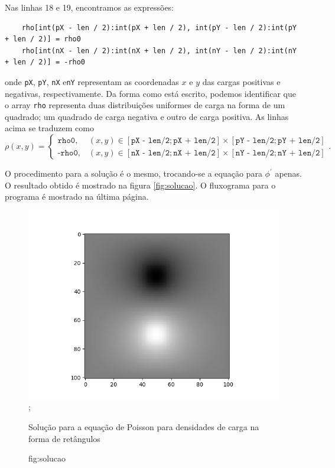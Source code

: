   Nas linhas 18 e 19, encontramos as expressões:
  \begin{lstlisting}
    rho[int(pX - len / 2):int(pX + len / 2), int(pY - len / 2):int(pY + len / 2)] = rho0
    rho[int(nX - len / 2):int(nX + len / 2), int(nY - len / 2):int(nY + len / 2)] = -rho0
  \end{lstlisting}

  onde \texttt{pX}, \texttt{pY}, \texttt{nX} e\texttt{nY} representam as coordenadas $x$ e $y$ das cargas positivas e negativas, respectivamente. Da forma como está escrito, podemos identificar que o array \texttt{rho} representa duas distribuições uniformes de carga na forma de um quadrado; um quadrado de carga negativa e outro de carga positiva. As linhas acima se traduzem como
  \begin{equation}
    \rho(x,y) =
              \begin{cases}
                \texttt{rho0}, \ &(x,y) \in [\texttt{pX - len/2}; \texttt{pX + len/2}] \times [\texttt{pY - len/2}; \texttt{pY + len/2}] \\
                \texttt{-rho0}, \ &(x,y) \in [\texttt{nX - len/2}; \texttt{nX + len/2}] \times [\texttt{nY - len/2}; \texttt{nY + len/2}]
              \end{cases}
              .
    \label{eq:3}
  \end{equation}

  O procedimento para a solução é o mesmo, trocando-se a equação para $\phi^\prime$ apenas. O resultado obtido é mostrado na figura \ref{fig:solucao}. O fluxograma para o programa é mostrado na última página.

  \newpage
  \begin{figure}[h]
    \center
    \includegraphics[scale = 1.0]{../Figure2};
    \caption{Solução para a equação de Poisson para densidades de carga na forma de retângulos}
    \caption{fig:solucao}
  \end{figure}

